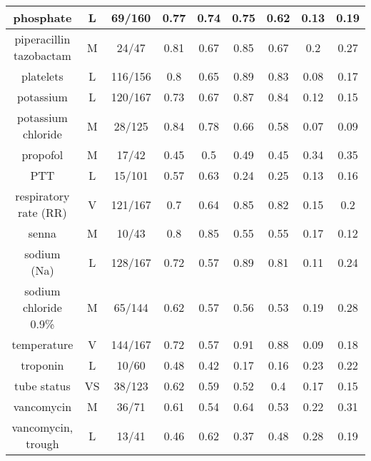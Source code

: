 \begin{scriptsize}
\begin{center}
\begin{longtable}{|ccc|c|c|c|c|c|c|}
\midrule
\multicolumn{1}{|c|}{phosphate} & \multicolumn{1}{c|}{L} & 69/160 & 0.77  & 0.74  & 0.75  & 0.62  & 0.13  & 0.19 \\
\midrule
\multicolumn{1}{|c|}{piperacillin tazobactam} & \multicolumn{1}{c|}{M} & 24/47 & 0.81  & 0.67  & 0.85  & 0.67  & 0.2   & 0.27 \\
\midrule
\multicolumn{1}{|c|}{platelets} & \multicolumn{1}{c|}{L} & 116/156 & 0.8   & 0.65  & 0.89  & 0.83  & 0.08  & 0.17 \\
\midrule
\multicolumn{1}{|c|}{potassium} & \multicolumn{1}{c|}{L} & 120/167 & 0.73  & 0.67  & 0.87  & 0.84  & 0.12  & 0.15 \\
\midrule
\multicolumn{1}{|c|}{potassium chloride} & \multicolumn{1}{c|}{M} & 28/125 & 0.84  & 0.78  & 0.66  & 0.58  & 0.07  & 0.09 \\
\midrule
\multicolumn{1}{|c|}{propofol} & \multicolumn{1}{c|}{M} & 17/42 & 0.45  & 0.5   & 0.49  & 0.45  & 0.34  & 0.35 \\
\midrule
\multicolumn{1}{|c|}{PTT} & \multicolumn{1}{c|}{L} & 15/101 & 0.57  & 0.63  & 0.24  & 0.25  & 0.13  & 0.16 \\
\midrule
\multicolumn{1}{|c|}{respiratory rate (RR)} & \multicolumn{1}{c|}{V} & 121/167 & 0.7   & 0.64  & 0.85  & 0.82  & 0.15  & 0.2 \\
\midrule
\multicolumn{1}{|c|}{senna} & \multicolumn{1}{c|}{M} & 10/43 & 0.8   & 0.85  & 0.55  & 0.55  & 0.17  & 0.12 \\
\midrule
\multicolumn{1}{|c|}{sodium (Na)} & \multicolumn{1}{c|}{L} & 128/167 & 0.72  & 0.57  & 0.89  & 0.81  & 0.11  & 0.24 \\
\midrule
\multicolumn{1}{|c|}{sodium chloride 0.9\%} & \multicolumn{1}{c|}{M} & 65/144 & 0.62  & 0.57  & 0.56  & 0.53  & 0.19  & 0.28 \\
\midrule
\multicolumn{1}{|c|}{temperature} & \multicolumn{1}{c|}{V} & 144/167 & 0.72  & 0.57  & 0.91  & 0.88  & 0.09  & 0.18 \\
\midrule
\multicolumn{1}{|c|}{troponin} & \multicolumn{1}{c|}{L} & 10/60 & 0.48  & 0.42  & 0.17  & 0.16  & 0.23  & 0.22 \\
\midrule
\multicolumn{1}{|c|}{tube status} & \multicolumn{1}{c|}{VS} & 38/123 & 0.62  & 0.59  & 0.52  & 0.4   & 0.17  & 0.15 \\
\midrule
\multicolumn{1}{|c|}{vancomycin} & \multicolumn{1}{c|}{M} & 36/71 & 0.61  & 0.54  & 0.64  & 0.53  & 0.22  & 0.31 \\
\midrule
\multicolumn{1}{|c|}{vancomycin, trough} & \multicolumn{1}{c|}{L} & 13/41 & 0.46  & 0.62  & 0.37  & 0.48  & 0.28  & 0.19 \\

\end{longtable}
\end{center}
\end{scriptsize}
